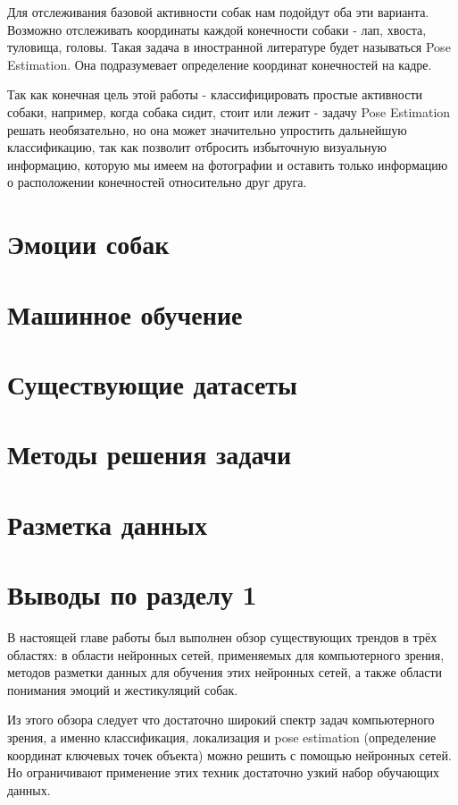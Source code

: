 Для отслеживания базовой активности собак нам подойдут оба эти варианта. Возможно отслеживать координаты каждой конечности собаки - лап, хвоста, туловища, головы. Такая задача в иностранной литературе будет называться Pose Estimation. Она подразумевает определение координат конечностей на кадре. 

Так как конечная цель этой работы - классифицировать простые активности собаки, например, когда собака сидит, стоит или лежит - задачу Pose Estimation решать необязательно, но она может значительно упростить дальнейшую классификацию, так как позволит отбросить избыточную визуальную информацию, которую мы имеем на фотографии и оставить только информацию о расположении конечностей относительно друг друга.


\section{Эмоции собак} \label{emotions}


\section{Машинное обучение} \label{ML}


\section{Существующие датасеты} \label{datasets}


\section{Методы решения задачи} \label{methods}


\section{Разметка данных} \label{labeling}



\section*{Выводы по разделу 1}
В настоящей главе работы был выполнен обзор существующих трендов в трёх областях: в области нейронных сетей, применяемых для компьютерного зрения, методов разметки данных для обучения этих нейронных сетей, а также области понимания эмоций и жестикуляций собак. 

Из этого обзора следует что достаточно широкий спектр задач компьютерного зрения, а именно классификация, локализация и pose estimation (определение координат ключевых точек объекта) можно решить с помощью нейронных сетей. Но ограничивают применение этих техник достаточно узкий набор обучающих данных.
